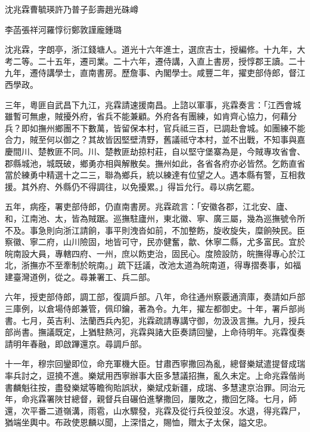 
\begin{pinyinscope}
沈兆霖曹毓瑛許乃普子彭壽趙光硃嶟

李菡張祥河羅惇衍鄭敦謹龐鍾璐

沈兆霖，字朗亭，浙江錢塘人。道光十六年進士，選庶吉士，授編修。十九年，大考二等。二十五年，遷司業。二十六年，遷侍講，入直上書房，授惇郡王讀。二十九年，遷侍講學士，直南書房。歷詹事、內閣學士。咸豐二年，擢吏部侍郎，督江西學政。

三年，粵匪自武昌下九江，兆霖請速援南昌。上諮以軍事，兆霖奏言：「江西會城雖暫可無慮，賊擾外府，省兵不能兼顧。外府各有團練，如肯齊心協力，何藉分兵？即如撫州鄉團不下數萬，皆留保本村，官兵祗三百，已調赴會城。如團練不能合力，賊至何以御之？其故皆因堅壁清野，舊議祗守本村，並不出戰，不知事與嘉慶間川、楚教匪不同。川、楚教匪劫掠村莊，自以堅守堡寨為是，今賊專攻省會、郡縣城池，城既破，鄉勇亦相與解散矣。撫州如此，各省各府亦必皆然。乞飭直省當於練勇中精選十之二三，聯為鄉兵，統以練達有位望之人。遇本縣有警，互相救援。其外府、外縣仍不得調往，以免擾累。」得旨允行。尋以病乞罷。

五年，病痊，署吏部侍郎，仍直南書房。兆霖疏言：「安徽各郡，江北安、廬、和，江南池、太，皆為賊踞。巡撫駐廬州，東北徽、寧、廣三屬，幾為巡撫號令所不及。事急則向浙江請餉，事平則洩沓如前，不加整飭，旋收旋失，糜餉殃民。臣察徽、寧二府，山川險固，地皆可守，民亦健奮，歙、休寧二縣，尤多富民。宜於皖南設大員，專轄四府、一州，庶以飭吏治，固民心。度險設防，皖撫得專心於江北，浙撫亦不至牽制於皖南。」疏下廷議，改池太道為皖南道，得專摺奏事，如福建臺灣道例，從之。尋兼署工、兵二部。

六年，授吏部侍郎，調工部，復調戶部。八年，命往通州察覈通濟庫，奏請如戶部三庫例，以倉場侍郎兼管，佩印鑰，著為令。九年，擢左都御史。十年，署戶部尚書。七月，英吉利、法蘭西兵內犯，兆霖疏請專講守御，勿汲汲言撫。九月，授兵部尚書。撫議既定，上猶駐熱河，兆霖與諸大臣奏請回鑾，上命待明年。兆霖復奏請明年春融，即啟蹕還京。尋調戶部。

十一年，穆宗回鑾即位，命充軍機大臣。甘肅西寧撒回為亂，總督樂斌遣提督成瑞率兵討之，逗撓不進。樂斌用西寧辦事大臣多慧議招撫，亂久未定。上命兆霖偕尚書麟魁往按，盡發樂斌等瞻徇貽誤狀，樂斌戍新疆，成瑞、多慧逮京治罪。同治元年，命兆霖署陜甘總督，親督兵自碾伯進擊撒回，屢敗之，撒回乞降。七月，師還，次平番二道嶺溝，雨雹，山水驟發，兆霖及從行兵役並沒。水退，得兆霖尸，猶端坐輿中。布政使恩麟以聞，上深惜之，賜恤，贈太子太保，謚文忠。


\end{pinyinscope}
